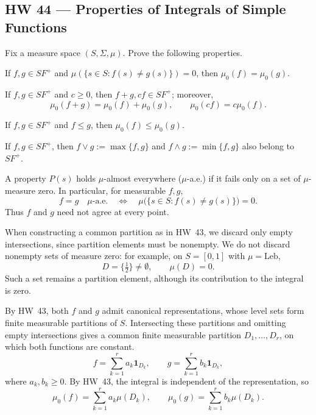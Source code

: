 \subsection*{HW 44 --- Properties of Integrals of Simple Functions}%
%

 Fix a measure space $(S,\Sigma,\mu)$. Prove the following properties.

 If $f,g\in SF^+$ and $\mu(\{s\in S:f(s)\ne g(s)\})=0$, then $\mu_0(f)=\mu_0(g)$.

 If $f,g\in SF^+$ and $c\ge0$, then $f+g,cf\in SF^+$; moreover,
\[
\mu_0(f+g)=\mu_0(f)+\mu_0(g),\qquad \mu_0(cf)=c\mu_0(f).
\]

 If $f,g\in SF^+$ and $f\le g$, then $\mu_0(f)\le\mu_0(g)$.

 If $f,g\in SF^+$, then $f\vee g:=\max\{f,g\}$ and $f\wedge g:=\min\{f,g\}$ also belong to $SF^+$.

\par\noindent{}%
%

A property $P(s)$ holds $\mu$-almost everywhere ($\mu$-a.e.) if it fails only on a set of $\mu$-measure zero. In particular, for measurable $f,g$,
\[
f=g\quad\mu\text{-a.e.}
\quad\Longleftrightarrow\quad
\mu\bigl(\{s\in S:f(s)\ne g(s)\}\bigr)=0.
\]
Thus $f$ and $g$ need not agree at every point.

When constructing a common partition as in HW~43, we discard only empty intersections, since partition elements must be nonempty. We do not discard nonempty sets of measure zero: for example, on $S=[0,1]$ with $\mu=\mathrm{Leb}$,
\[
D=\{\tfrac12\}\ne\emptyset,\qquad \mu(D)=0.
\]
Such a set remains a partition element, although its contribution to the integral is zero.

\par\noindent{}\par\nobreak

By HW~43, both $f$ and $g$ admit canonical representations, whose level sets form finite measurable partitions of $S$. Intersecting these partitions and omitting empty intersections gives a common finite measurable partition $D_1,\ldots,D_r$, on which both functions are constant.
\[
f=\sum_{k=1}^{r}a_k\mathbf1_{D_k},\qquad
 g=\sum_{k=1}^{r}b_k\mathbf1_{D_k},
\]
where $a_k,b_k\ge0$. By HW~43, the integral is independent of the representation, so
\[
\mu_0(f)=\sum_{k=1}^{r}a_k\mu(D_k),\qquad
\mu_0(g)=\sum_{k=1}^{r}b_k\mu(D_k).
\]

